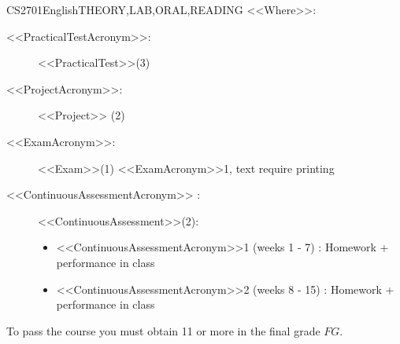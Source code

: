 \begin{evaluation}{CS2701}{English}{THEORY,LAB,ORAL,READING}
  \vspace{2mm}
  \noindent <<Where>>:
  \begin{description}
    \item[<<PracticalTestAcronym>>:] <<PracticalTest>>(3)
    \item[<<ProjectAcronym>>:] <<Project>> (2)  
    \item[<<ExamAcronym>>:] <<Exam>>(1) <<ExamAcronym>>1, text require printing
    \item[<<ContinuousAssessmentAcronym>> :] <<ContinuousAssessment>>(2):
     \begin{itemize}
            \item  <<ContinuousAssessmentAcronym>>1 (weeks 1 - 7) : Homework + performance in class
            \item <<ContinuousAssessmentAcronym>>2 (weeks 8 - 15) :  Homework + performance in class
      \end{itemize}
  \end{description}

  \noindent To pass the course you must obtain 11 or more in the final grade $FG$.
  \end{evaluation}
 

